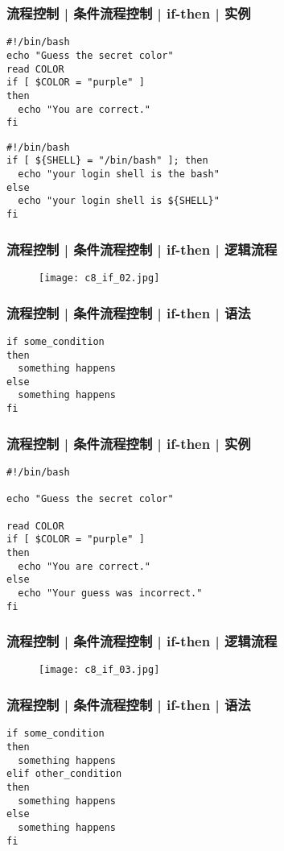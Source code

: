 \begin{frame}[fragile]
  \frametitle{流程控制 | 条件流程控制 | if-then | 实例}
\begin{lstlisting}
#!/bin/bash
echo "Guess the secret color"
read COLOR
if [ $COLOR = "purple" ]
then
  echo "You are correct."
fi
\end{lstlisting}
\pause
\begin{lstlisting}
#!/bin/bash
if [ ${SHELL} = "/bin/bash" ]; then
  echo "your login shell is the bash"
else
  echo "your login shell is ${SHELL}"
fi
\end{lstlisting}
\end{frame}

\begin{frame}
  \frametitle{流程控制 | 条件流程控制 | if-then | 逻辑流程}
  \begin{figure}
    \centering
    \texttt{[image: c8\_if\_02.jpg]}
  \end{figure}
\end{frame}

\begin{frame}[fragile]
  \frametitle{流程控制 | 条件流程控制 | if-then | \alert{语法}}
\begin{lstlisting}
if some_condition
then
  something happens
else
  something happens
fi
\end{lstlisting}
\end{frame}

\begin{frame}[fragile]
  \frametitle{流程控制 | 条件流程控制 | if-then | 实例}
\begin{lstlisting}
#!/bin/bash

echo "Guess the secret color"

read COLOR
if [ $COLOR = "purple" ]
then
  echo "You are correct."
else
  echo "Your guess was incorrect."
fi
\end{lstlisting}
\end{frame}

\begin{frame}
  \frametitle{流程控制 | 条件流程控制 | if-then | 逻辑流程}
  \begin{figure}
    \centering
    \texttt{[image: c8\_if\_03.jpg]}
  \end{figure}
\end{frame}

\begin{frame}[fragile]
  \frametitle{流程控制 | 条件流程控制 | if-then | \alert{语法}}
\begin{lstlisting}
if some_condition
then
  something happens
elif other_condition
then
  something happens
else
  something happens
fi
\end{lstlisting}
\end{frame}

